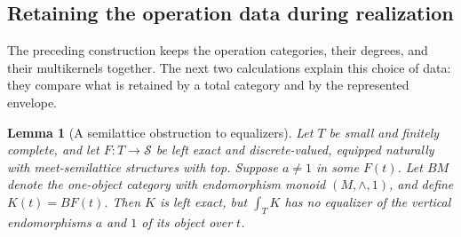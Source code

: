 \documentclass[oneside]{article}
\theoremstyle{plain}
\newtheorem{lemma}[theorem]{Lemma}
\theoremstyle{definition}
\theoremstyle{remark}
\newcommand{\Sps}{\mathcal S}
\begin{document}
\subsection{Retaining the operation data during realization}

The preceding construction keeps the operation categories, their
degrees, and their multikernels together. The next two calculations
explain this choice of data: they compare what is retained by a
total category and by the represented envelope.

\begin{lemma}[A semilattice obstruction to equalizers]
\label{lem:semilattice-total-category-obstruction}
Let $T$ be small and finitely complete, and let $F:T\to\Sps$ be
left exact and discrete-valued, equipped naturally with meet-semilattice
structures with top. Suppose $a\ne1$ in some $F(t)$.
Let $BM$ denote the one-object category with endomorphism monoid
$(M,\wedge,1)$, and define $K(t)=BF(t)$. Then $K$ is left exact,
but $\int_TK$ has no equalizer of the vertical endomorphisms $a$ and
$1$ of its object over $t$.
\end{lemma}
\end{document}

